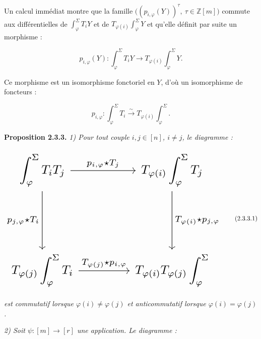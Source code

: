 %
Un calcul immédiat montre que la famille
$\bigl((p_{i,\varphi}(Y))^\tau,\ \tau\in\mathbb Z[m]\bigr)$ commute
aux différentielles de $\int_\varphi^\Sigma T_iY$ et de
$T_{\varphi(i)}\int_\varphi^\Sigma Y$ et qu'elle définit par suite un
morphisme :

\begin{equation}
  p_{i,\varphi}(Y)\colon
  \int_\varphi^\Sigma T_iY
  \longrightarrow
  T_{\varphi(i)}\int_\varphi^\Sigma Y.
  \tag{2.3.2.2}
\end{equation}

Ce morphisme est un isomorphisme fonctoriel en $Y$, d'où un isomorphisme
de foncteurs :

\begin{equation}
  p_{i,\varphi}\colon
  \int_\varphi^\Sigma T_i
  \xrightarrow{\ \sim\ }
  T_{\varphi(i)}\int_\varphi^\Sigma.
  \tag{2.3.2.3}
\end{equation}

\noindent\textbf{Proposition 2.3.3.}\quad
\emph{1) Pour tout couple $i,j\in[n]$, $i\ne j$, le diagramme :}

\begin{equation}
  \resizebox{\textwidth}{!}{%
    $\begin{tikzcd}[ampersand replacement=\&,column sep=4.2em,row sep=4.8em]
      \displaystyle\int_\varphi^\Sigma T_iT_j
        \arrow[r,"{p_{i,\varphi}\star T_j}"]
        \arrow[d,"{p_{j,\varphi}\star T_i}"']
        \& \displaystyle T_{\varphi(i)}\int_\varphi^\Sigma T_j
          \arrow[d,"{T_{\varphi(i)}\star p_{j,\varphi}}"] \\
      \displaystyle T_{\varphi(j)}\int_\varphi^\Sigma T_i
        \arrow[r,"{T_{\varphi(j)}\star p_{i,\varphi}}"]
        \& \displaystyle T_{\varphi(i)}T_{\varphi(j)}\int_\varphi^\Sigma
    \end{tikzcd}$%
  }
  \tag{2.3.3.1}
\end{equation}

\emph{est commutatif lorsque $\varphi(i)\ne\varphi(j)$ et
anticommutatif lorsque $\varphi(i)=\varphi(j)$.}

\emph{2) Soit $\psi\colon[m]\longrightarrow[r]$ une application. Le
diagramme :}


